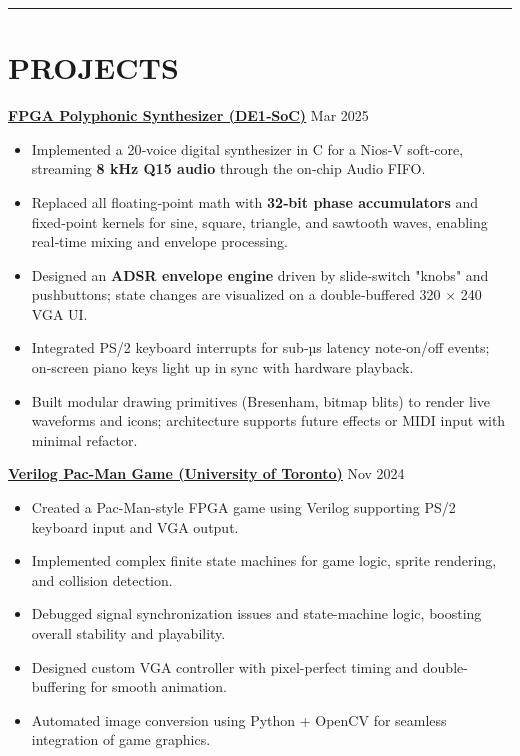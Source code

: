 \documentclass[letterpaper,10pt]{article}
\begin{document}
\noindent\rule{\linewidth}{1pt}

\section*{\textbf{PROJECTS}}

\noindent\href{https://github.com/alexzjm/ece243-sound-synthesizer}{\uline{
\textbf{FPGA Polyphonic Synthesizer (DE1‑SoC)}}} \hfill Mar 2025
\begin{itemize}[leftmargin=0.2in]
    \item Implemented a 20‑voice digital synthesizer in C for a Nios‑V soft‑core, streaming \textbf{8 kHz Q15 audio} through the on‑chip Audio FIFO.  
    \item Replaced all floating‑point math with \textbf{32‑bit phase accumulators} and fixed‑point kernels for sine, square, triangle, and sawtooth waves, enabling real‑time mixing and envelope processing.  
    \item Designed an \textbf{ADSR envelope engine} driven by slide‑switch "knobs" and pushbuttons; state changes are visualized on a double‑buffered 320 × 240 VGA UI.  
    \item Integrated PS/2 keyboard interrupts for sub‑µs latency note‑on/off events; on‑screen piano keys light up in sync with hardware playback.  
    \item Built modular drawing primitives (Bresenham, bitmap blits) to render live waveforms and icons; architecture supports future effects or MIDI input with minimal refactor.  
\end{itemize}

\vspace{0.2cm}
\noindent\href{https://github.com/Ken-2511/ECE241-Project}{\uline{
\textbf{Verilog Pac-Man Game (University of Toronto)}}} \hfill Nov 2024
\begin{itemize}[leftmargin=0.2in]
    \item Created a Pac-Man-style FPGA game using Verilog supporting PS/2 keyboard input and VGA output.
    \item Implemented complex finite state machines for game logic, sprite rendering, and collision detection.
    \item Debugged signal synchronization issues and state-machine logic, boosting overall stability and playability.
    \item Designed custom VGA controller with pixel-perfect timing and double-buffering for smooth animation.
    \item Automated image conversion using Python + OpenCV for seamless integration of game graphics.
\end{itemize}
\end{document}
